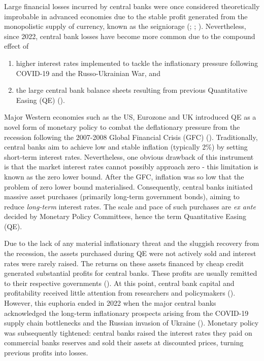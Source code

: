 \documentclass[
  a4paper,
  abstract=true]{scrartcl}
\theoremstyle{definition}
\begin{document}
\setcounter{page}{1}

Large financial losses incurred by central banks were once considered
theoretically improbable in advanced economies due to the stable profit
generated from the monopolistic supply of currency, known as the
seigniorage (;
;
). Nevertheless, since 2022,
central bank losses have become more common due to the compound effect
of

\begin{enumerate}
\def\labelenumi{\arabic{enumi}.}
\item
  higher interest rates implemented to tackle the inflationary pressure
  following COVID-19 and the Russo-Ukrainian War, and
\item
  the large central bank balance sheets resulting from previous
  Quantitative Easing (QE) ().
\end{enumerate}

Major Western economies such as the US, Eurozone and UK introduced QE as
a novel form of monetary policy to combat the deflationary pressure from
the recession following the 2007-2008 Global Financial Crisis (GFC)
(). Traditionally, central
banks aim to achieve low and stable inflation (typically 2\%) by setting
short-term interest rates. Nevertheless, one obvious drawback of this
instrument is that the market interest rates cannot possibly approach
zero - this limitation is known as the zero lower bound. After the GFC,
inflation was so low that the problem of zero lower bound materialised.
Consequently, central banks initiated massive asset purchases (primarily
long-term government bonds), aiming to reduce \emph{long-term} interest
rates. The scale and pace of such purchases are \emph{ex ante} decided
by Monetary Policy Committees, hence the term Quantitative Easing (QE).

Due to the lack of any material inflationary threat and the sluggish
recovery from the recession, the assets purchased during QE were not
actively sold and interest rates were rarely raised. The returns on
these assets financed by cheap credit generated substantial profits for
central banks. These profits are usually remitted to their respective
governments (). At
this point, central bank capital and profitability received little
attention from researchers and policymakers
(). However,
this euphoria ended in 2022 when the major central banks acknowledged
the long-term inflationary prospects arising from the COVID-19 supply
chain bottlenecks and the Russian invasion of Ukraine
(). Monetary
policy was subsequently tightened: central banks raised the interest
rates they paid on commercial banks reserves and sold their assets at
discounted prices, turning previous profits into losses.
\end{document}

